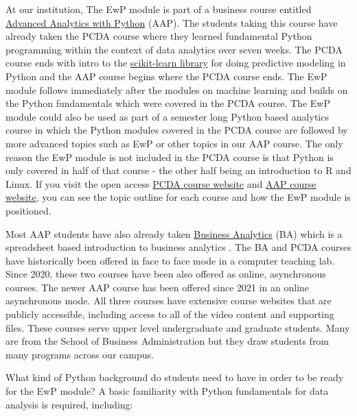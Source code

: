 \documentclass[ited]{informs3}                      %
\begin{document}
At our institution, The EwP module is part of a business course entitled  \href{http://www.sba.oakland.edu/faculty/isken/courses/aap}{Advanced Analytics with Python} (AAP). The students taking this course have already taken the PCDA course where they learned fundamental Python programming within the context of data analytics over seven weeks. The PCDA course ends with intro to the \href{https://scikit-learn.org/stable/index.html}{scikit-learn library} for doing predictive modeling in Python and the AAP course begins where the PCDA course ends. The EwP module follows immediately after the modules on machine learning and builds on the Python fundamentals which were covered in the PCDA course. The EwP module could also be used as part of a semester long Python based analytics course in which the Python modules covered in the PCDA course are followed by more advanced topics such as EwP or other topics in our AAP course. The only reason the EwP module is not included in the PCDA course is that Python is only covered in half of that course - the other half being an introduction to R and Linux. If you visit the open access \href{http://www.sba.oakland.edu/faculty/isken/courses/pcda/}{PCDA course website}  and \href{http://www.sba.oakland.edu/faculty/isken/courses/aap/}{AAP course website}, you can see the topic outline for each course and how the EwP module is positioned. 

Most AAP students have also already taken   \href{http://www.sba.oakland.edu/faculty/isken/courses/ba}{Business Analytics} (BA) which is a spreadsheet based introduction to business analytics \citep{isken2003:muddy,isken2014:lab}. The BA and PCDA courses have historically been offered in face to face mode in a computer teaching lab. Since 2020, these two courses have been also offered as online, asynchronous courses. The newer AAP course has been offered since 2021 in an online asynchronous mode. All three courses have extensive course websites that are publicly accessible, including access to all of the video content and supporting files. These courses serve upper level undergraduate and graduate students. Many are from the School of Business Administration but they draw students from many programs across our campus. 

What kind of Python background do students need to have in order to be ready for the EwP module? A basic familiarity with Python fundamentals for data analysis is required, including:
\end{document}

